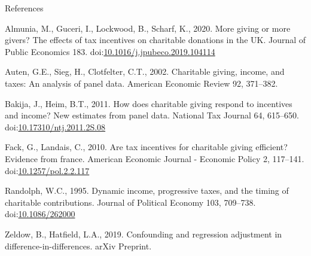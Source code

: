 \documentclass[
  ignorenonframetext,
  aspectratio=169,
]{beamer}
\newlength{\cslhangindent}
\newlength{\cslentryspacingunit} %
\newenvironment{CSLReferences}[2] %
 {%
  \setlength{\parindent}{0pt}
  \ifodd #1
  \let\oldpar\par
  \def\par{\hangindent=\cslhangindent\oldpar}
  \fi
  \setlength{\parskip}{#2\cslentryspacingunit}
 }%
 {}
\begin{document}
\begin{frame}[allowframebreaks]{References}
\hypertarget{refs}{}
\begin{CSLReferences}{1}{0}
\leavevmode\hypertarget{ref-Almunia2020}{}%
Almunia, M., Guceri, I., Lockwood, B., Scharf, K., 2020. More giving or more givers? The effects of tax incentives on charitable donations in the UK. Journal of Public Economics 183. doi:\href{https://doi.org/10.1016/j.jpubeco.2019.104114}{10.1016/j.jpubeco.2019.104114}

\leavevmode\hypertarget{ref-Auten2002}{}%
Auten, G.E., Sieg, H., Clotfelter, C.T., 2002. Charitable giving, income, and taxes: An analysis of panel data. American Economic Review 92, 371--382.

\leavevmode\hypertarget{ref-Bakija2011}{}%
Bakija, J., Heim, B.T., 2011. How does charitable giving respond to incentives and income? New estimates from panel data. National Tax Journal 64, 615--650. doi:\href{https://doi.org/10.17310/ntj.2011.2S.08}{10.17310/ntj.2011.2S.08}

\leavevmode\hypertarget{ref-Fack2010}{}%
Fack, G., Landais, C., 2010. Are tax incentives for charitable giving efficient? Evidence from france. American Economic Journal - Economic Policy 2, 117--141. doi:\href{https://doi.org/10.1257/pol.2.2.117}{10.1257/pol.2.2.117}

\leavevmode\hypertarget{ref-Randolph1995}{}%
Randolph, W.C., 1995. Dynamic income, progressive taxes, and the timing of charitable contributions. Journal of Political Economy 103, 709--738. doi:\href{https://doi.org/10.1086/262000}{10.1086/262000}

\leavevmode\hypertarget{ref-Zeldow2019}{}%
Zeldow, B., Hatfield, L.A., 2019. Confounding and regression adjustment in difference-in-differences. arXiv Preprint.

\end{CSLReferences}
\end{frame}
\end{document}
